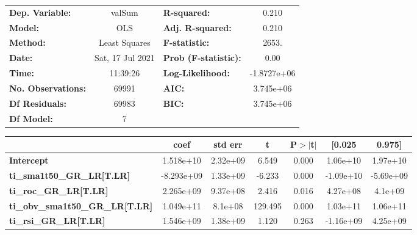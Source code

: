 \begin{center}
\begin{tabular}{lclc}
\toprule
\textbf{Dep. Variable:}                 &      valSum      & \textbf{  R-squared:         } &      0.210   \\
\textbf{Model:}                         &       OLS        & \textbf{  Adj. R-squared:    } &      0.210   \\
\textbf{Method:}                        &  Least Squares   & \textbf{  F-statistic:       } &      2653.   \\
\textbf{Date:}                          & Sat, 17 Jul 2021 & \textbf{  Prob (F-statistic):} &      0.00    \\
\textbf{Time:}                          &     11:39:26     & \textbf{  Log-Likelihood:    } & -1.8727e+06  \\
\textbf{No. Observations:}              &       69991      & \textbf{  AIC:               } &  3.745e+06   \\
\textbf{Df Residuals:}                  &       69983      & \textbf{  BIC:               } &  3.745e+06   \\
\textbf{Df Model:}                      &           7      & \textbf{                     } &              \\
\bottomrule
\end{tabular}
\begin{tabular}{lcccccc}
                                        & \textbf{coef} & \textbf{std err} & \textbf{t} & \textbf{P$> |$t$|$} & \textbf{[0.025} & \textbf{0.975]}  \\
\midrule
\textbf{Intercept}                      &    1.518e+10  &     2.32e+09     &     6.549  &         0.000        &     1.06e+10    &     1.97e+10     \\
\textbf{ti\_sma1t50\_GR\_LR[T.LR]}      &   -8.293e+09  &     1.33e+09     &    -6.233  &         0.000        &    -1.09e+10    &    -5.69e+09     \\
\textbf{ti\_roc\_GR\_LR[T.LR]}          &    2.265e+09  &     9.37e+08     &     2.416  &         0.016        &     4.27e+08    &      4.1e+09     \\
\textbf{ti\_obv\_sma1t50\_GR\_LR[T.LR]} &    1.049e+11  &      8.1e+08     &   129.495  &         0.000        &     1.03e+11    &     1.06e+11     \\
\textbf{ti\_rsi\_GR\_LR[T.LR]}          &    1.546e+09  &     1.38e+09     &     1.120  &         0.263        &    -1.16e+09    &     4.25e+09     \\

\end{tabular}
\end{center}

